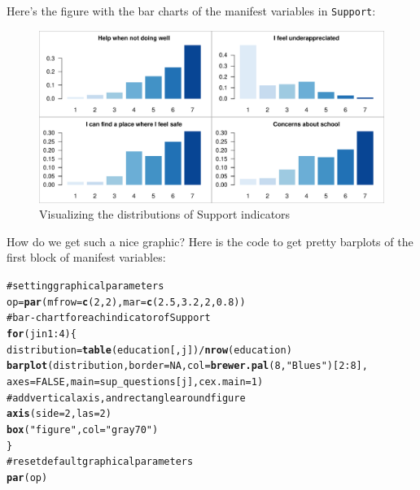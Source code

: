 \documentclass[12pt]{book}\usepackage{graphicx, color}
\makeatletter
\newcommand{\hlfunctioncall}[1]{\textcolor[rgb]{0.501960784313725,0,0.329411764705882}{\textbf{#1}}}%
\newcommand{\hlstring}[1]{\textcolor[rgb]{0.6,0.6,1}{#1}}%
\newcommand{\hlcomment}[1]{\textcolor[rgb]{0.180392156862745,0.6,0.341176470588235}{#1}}%
\newenvironment{kframe}{%
 \def\at@end@of@kframe{}%
 \ifinner\ifhmode%
  \def\at@end@of@kframe{\end{minipage}}%
  \begin{minipage}{\columnwidth}%
 \fi\fi%
 \def\FrameCommand##1{\hskip\@totalleftmargin \hskip-\fboxsep
 \colorbox{shadecolor}{##1}\hskip-\fboxsep
     \hskip-\linewidth \hskip-\@totalleftmargin \hskip\columnwidth}%
 \MakeFramed {\advance\hsize-\width
   \@totalleftmargin\z@ \linewidth\hsize
   \@setminipage}}%
 {\par\unskip\endMakeFramed%
 \at@end@of@kframe}
\newenvironment{knitrout}{}{} %
\newcommand{\code}[1]{\texttt{#1}}
\makeatother
\begin{document}
Here's the figure with the bar charts of the manifest variables in \code{Support}:
\begin{knitrout}
\color{fgcolor}\begin{figure}[h]


{\centering \includegraphics[width=1\linewidth,height=.6\linewidth]{figure/barplots_support_figure} 

}

\caption[Visualizing the distributions of Support indicators]{Visualizing the distributions of Support indicators\label{fig:barplots_support_figure}}
\end{figure}


\end{knitrout}


How do we get such a nice graphic? Here is the code to get pretty barplots of the first block of manifest variables: 
\begin{knitrout}
\color{fgcolor}\begin{kframe}
\begin{alltt}
\hlcomment{# setting graphical parameters}
op = \hlfunctioncall{par}(mfrow = \hlfunctioncall{c}(2,2), mar = \hlfunctioncall{c}(2.5, 3.2, 2, 0.8))
\hlcomment{# bar-chart for each indicator of Support}
\hlfunctioncall{for} (j in 1:4) \{
  distribution = \hlfunctioncall{table}(education[,j]) / \hlfunctioncall{nrow}(education)
  \hlfunctioncall{barplot}(distribution, border = NA, col = \hlfunctioncall{brewer.pal}(8, \hlstring{"Blues"})[2:8], 
          axes = FALSE, main = sup_questions[j], cex.main = 1)
\hlcomment{  # add vertical axis, and rectangle around figure}
  \hlfunctioncall{axis}(side = 2, las=2)
  \hlfunctioncall{box}(\hlstring{"figure"}, col=\hlstring{"gray70"})
\}
\hlcomment{# reset default graphical parameters}
\hlfunctioncall{par}(op)
\end{alltt}
\end{kframe}
\end{knitrout}
\end{document}
